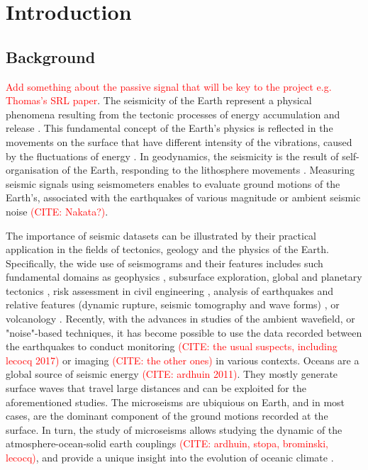 \documentclass[informatics,article,submit,moreauthors,pdftex]{Definitions/mdpi}
\newcommand{\CITE}[1]{\textcolor{red}{(CITE: #1)}}
\begin{document}

\section{Introduction}

\subsection{Background}
\textcolor{red}{Add something about the passive signal that will be key to the project e.g. Thomas's SRL paper}. The seismicity of the Earth represent a physical phenomena resulting from the tectonic processes of energy accumulation and release \cite{GutenbergRichter}. This fundamental concept of the Earth's physics is reflected in the movements on the surface that have different intensity of the vibrations, caused by the fluctuations of energy \cite{Shearer2019}. In geodynamics, the seismicity is the result of self-organisation of the Earth, responding to the lithosphere movements \cite{UdiasBuforn2017}. Measuring seismic signals using seismometers enables to evaluate ground motions of the Earth’s, associated with the earthquakes of various magnitude or ambient seismic noise \CITE{Nakata?}. 

The importance of seismic datasets can be illustrated by their practical application in the fields of tectonics, geology and the physics of the Earth. Specifically, the wide use of seismograms and their features \cite{Ammon2021} includes such fundamental domains as geophysics \cite{Kulhanek}, subsurface exploration, global and planetary tectonics \citep{Crampin,Jackson2002,Leroyetal2010}, risk assessment in civil engineering \citep{Phillips,Pileckietal2017, Kurzeja}, analysis of earthquakes and relative features (dynamic rupture, seismic tomography and wave forms) \cite{Ahorner,Steinmann,Amorese,Lomnitz,Yuliatmoko}, or volcanology \cite[][e.g., ]{Pezzo,DePlaenetal2018,DePlaenetal2018b}. Recently, with the advances in studies of the ambient wavefield, or "noise"-based techniques, it has become possible to use the data recorded between the earthquakes to conduct monitoring \CITE{the usual suspects, including lecocq 2017} or imaging \CITE{the other ones} in various contexts. Oceans are a global source of seismic energy \CITE{ardhuin 2011}. They mostly generate surface waves that travel large distances and can be exploited for the aforementioned studies. The microseisms are ubiquious on Earth, and in most cases, are the dominant component of the ground motions recorded at the surface. In turn, the study of microseisms allows studying the dynamic of the atmosphere-ocean-solid earth couplings \CITE{ardhuin, stopa, brominski, lecocq}, and provide a unique insight into the evolution of oceanic climate \cite{Singh2021,Toyokunietal2015}.
\end{document}
